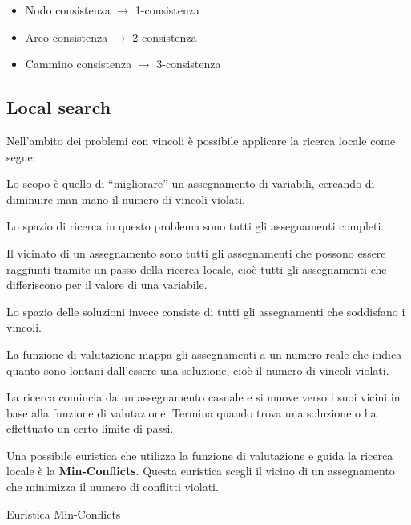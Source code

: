 \begin{itemize}
 \item Nodo consistenza $\rightarrow$ 1-consistenza
 \item Arco consistenza $\rightarrow$ 2-consistenza
 \item Cammino consistenza $\rightarrow$ 3-consistenza
\end{itemize}

\subsection{Local search}

Nell'ambito dei problemi con vincoli è possibile applicare la ricerca
locale come segue:

Lo scopo è quello di ``migliorare'' un assegnamento di variabili, cercando di
diminuire man mano il numero di vincoli violati.

Lo spazio di ricerca in questo problema sono tutti gli assegnamenti completi.

Il vicinato di un assegnamento sono tutti gli assegnamenti che possono essere
raggiunti tramite un passo della ricerca locale, cioè tutti gli assegnamenti
che differiscono per il valore di una variabile.

Lo spazio delle soluzioni invece consiste di tutti gli assegnamenti che
soddisfano i vincoli.

La funzione di valutazione mappa gli assegnamenti a un numero reale che indica
quanto sono lontani dall'essere una soluzione, cioè il numero di vincoli
violati.

La ricerca comincia da un assegnamento casuale e si muove verso i suoi vicini
in base alla funzione di valutazione. Termina quando trova una soluzione o
ha effettuato un certo limite di passi.

Una possibile euristica che utilizza la funzione di valutazione e guida la
ricerca locale è la \textbf{Min-Conflicts}. Questa euristica scegli il vicino
di un assegnamento che minimizza il numero di conflitti violati.

\begin{algorithm}
    \caption{Euristica Min-Conflicts}
    \label{alg:minconflicts}
    \begin{algorithmic}[1]
              \EndIf
            \EndFor
        \EndProcedure
    \end{algorithmic}
\end{algorithm}

